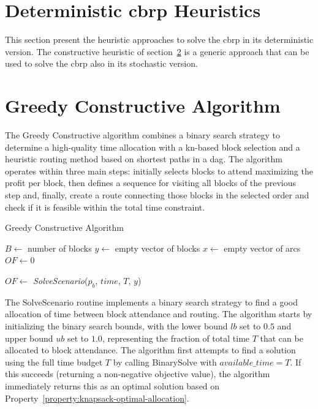 \section{Deterministic \gls{cbrp} Heuristics}\label{sec:deterministic-heuristics}

This section present the heuristic approaches to solve the \gls{cbrp} in its deterministic version. The constructive heuristic of section~\ref{sec:greedy-constructive-algorithm} is a generic approach that can be used to solve the \gls{cbrp} also in its stochastic version.

\newcommand{\Call}[2]{\textit{#1}(#2)}

\section{Greedy Constructive Algorithm}\label{sec:greedy-constructive-algorithm}

The Greedy Constructive algorithm combines a binary search strategy to determine a high-quality time allocation with a \gls{kn}-based block selection and a heuristic routing method based on shortest paths in a \gls{dag}. The algorithm operates within three main steps: initially selects blocks to attend maximizing the profit per block, then defines a sequence for visiting all blocks of the previous step and, finally, create a route connecting those blocks in the selected order and check if it is feasible within the total time constraint.

\begin{algorithm}[h!]
	\caption{Greedy Constructive Algorithm}
	\SetAlgoLined

	$B \leftarrow$ number of blocks\;
	$y \leftarrow$ empty vector of blocks\;
	$x \leftarrow$ empty vector of arcs\;
	$OF \leftarrow 0$\;


	$OF \leftarrow$ \Call{SolveScenario}{$p_b$, $time$, $T$, $y$}\;

	\;
\end{algorithm}

The SolveScenario routine implements a binary search strategy to find a good allocation of time between block attendance and routing. The algorithm starts by initializing the binary search bounds, with the lower bound $lb$ set to $0.5$ and upper bound $ub$ set to $1.0$, representing the fraction of total time $T$ that can be allocated to block attendance. The algorithm first attempts to find a solution using the full time budget $T$ by calling BinarySolve with $available\_time = T$. If this succeeds (returning a non-negative objective value), the algorithm immediately returns this as an optimal solution based on Property~\ref{property:knapsack-optimal-allocation}.

